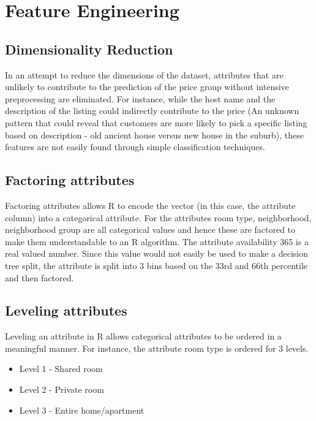 \documentclass{sig-alternate}
\begin{document}
	\section{Feature Engineering} 
	\subsection{Dimensionality Reduction}
	In an attempt to reduce the dimensions of the dataset, attributes that are unlikely to contribute to the prediction of the price group without intensive preprocessing are eliminated. For instance, while the host name and the description of the listing could indirectly contribute to the price (An unknown pattern that could reveal that customers are more likely to pick a specific listing based on description - old ancient house versus new house in the suburb), these features are not easily found through simple classification techniques. 
	\subsection{Factoring attributes}
	Factoring attributes allows R to encode the vector (in this case, the attribute column) into a categorical attribute. For the attributes room type, neighborhood, neighborhood group are all categorical values and hence these are factored to make them understandable to an R algorithm. The attribute availability 365 is a real valued number. Since this value would not easily be used to make a decision tree split, the attribute is split into 3 bins based on the 33rd and 66th percentile and then factored.  
	\subsection{Leveling attributes}
	Leveling an attribute in R allows categorical attributes to be ordered in a meaningful manner. For instance, the attribute room type is ordered for 3 levels.
	\begin{itemize}
		\item Level 1 - Shared room
		\item Level 2 - Private room
		\item Level 3 - Entire home/apartment
	\end{itemize}
	
\end{document}
